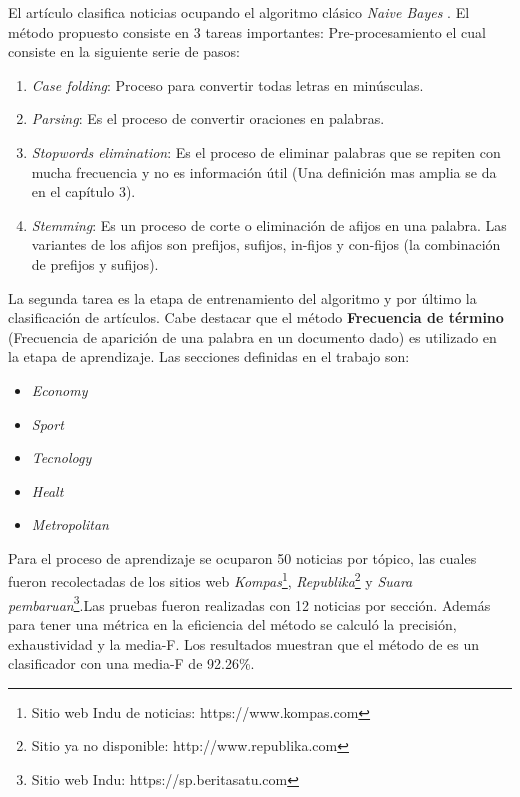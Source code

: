El artículo clasifica noticias ocupando el algoritmo clásico \textit{Naive Bayes} \citep{CD7}. El método propuesto consiste en 3 tareas importantes: Pre-procesamiento el cual consiste en la siguiente serie de pasos: 
 
\begin{enumerate}

	\item \textit{Case folding}: Proceso para convertir todas letras en minúsculas.
	\item \textit{Parsing}: Es el proceso de convertir oraciones en palabras.
	\item \textit{Stopwords elimination}: Es el proceso de eliminar palabras que se repiten con mucha frecuencia y no es información útil (Una definición mas amplia se da en el capítulo 3).
	\item \textit{Stemming}: Es un proceso de corte o eliminación de afijos en una palabra. Las variantes de los afijos son prefijos, sufijos, in-fijos y con-fijos (la combinación de prefijos y sufijos).

\end{enumerate}	

La segunda tarea es la etapa de entrenamiento del algoritmo y por último la clasificación de artículos. Cabe destacar que el método \textbf{Frecuencia de término} (Frecuencia de aparición de una palabra en un documento dado) es utilizado en la etapa de aprendizaje. Las secciones definidas en el trabajo son: 

\begin{itemize}

	\item \textit{Economy}
	\item \textit{Sport}
	\item \textit{Tecnology}
	\item \textit{Healt} 
	\item \textit{Metropolitan}

\end{itemize}

Para el proceso de aprendizaje se ocuparon 50 noticias por tópico, las cuales fueron recolectadas de los sitios web \textit{Kompas}\footnote{Sitio web Indu de noticias: https://www.kompas.com}, \textit{Republika}\footnote{Sitio ya no disponible: http://www.republika.com} y \textit{Suara pembaruan}\footnote{Sitio web Indu: https://sp.beritasatu.com}.Las pruebas fueron realizadas con 12 noticias por sección. Además para tener una métrica en la eficiencia del método se calculó la precisión, exhaustividad y la media-F. Los resultados muestran que el método de  es un clasificador con una media-F de 92.26\%.\\ 

